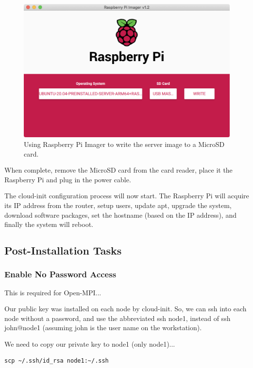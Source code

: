 \documentclass{article}
\begin{document}
\begin{figure}
	\centering	
	\includegraphics[width=1.0\textwidth]{screenshots/imager-write.png}
	\caption{Using Raspberry Pi Imager to write the server image to a MicroSD card.}
\end{figure}

When complete, remove the MicroSD card from the card reader, place it the Raspberry Pi and plug in the power cable.

The cloud-init configuration process will now start. The Raspberry Pi will acquire its IP address from the router, setup users, update apt, upgrade the system, download software packages, set the hostname (based on the IP address), and finally the system will reboot.


\subsection{Post-Installation Tasks}

\subsubsection{Enable No Password Access}

This is required for Open-MPI...

Our public key was installed on each node by cloud-init. So, we can ssh into each node without a password, and use the abbreviated ssh node1, instead of ssh john@node1 (assuming john is the user name on the workstation).

We need to copy our private key to node1 (only node1)...

\begin{lstlisting}[frame=single]
scp ~/.ssh/id_rsa node1:~/.ssh
\end{lstlisting}
\end{document}
